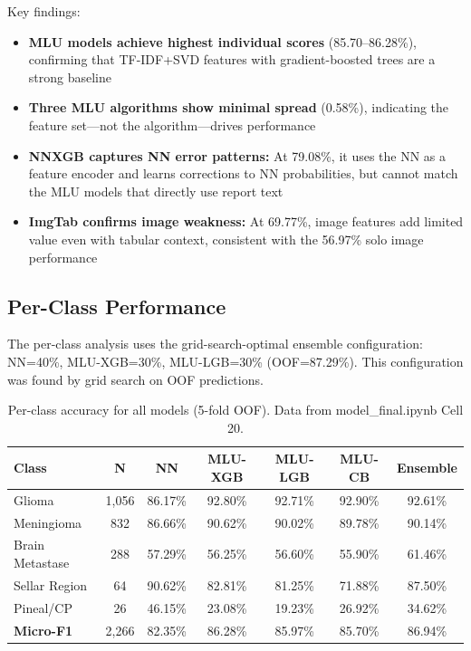 Key findings:
\begin{itemize}
  \item \textbf{MLU models achieve highest individual scores} (85.70--86.28\%), confirming that TF-IDF+SVD features with gradient-boosted trees are a strong baseline
  \item \textbf{Three MLU algorithms show minimal spread} (0.58\%), indicating the feature set---not the algorithm---drives performance
  \item \textbf{NNXGB captures NN error patterns:} At 79.08\%, it uses the NN as a feature encoder and learns corrections to NN probabilities, but cannot match the MLU models that directly use report text
  \item \textbf{ImgTab confirms image weakness:} At 69.77\%, image features add limited value even with tabular context, consistent with the 56.97\% solo image performance
\end{itemize}

\subsection{Per-Class Performance}

The per-class analysis uses the grid-search-optimal ensemble configuration: NN=40\%, MLU-XGB=30\%, MLU-LGB=30\% (OOF=87.29\%). This configuration was found by grid search on OOF predictions.

\begin{table}[H]
\centering
\caption{Per-class accuracy for all models (5-fold OOF). Data from model\_final.ipynb Cell 20.}
\label{tab:per_class}
\begin{tabular}{lcccccc}
\toprule
\textbf{Class} & \textbf{N} & \textbf{NN} & \textbf{MLU-XGB} & \textbf{MLU-LGB} & \textbf{MLU-CB} & \textbf{Ensemble} \\
\midrule
Glioma & 1,056 & 86.17\% & 92.80\% & 92.71\% & 92.90\% & 92.61\% \\
Meningioma & 832 & 86.66\% & 90.62\% & 90.02\% & 89.78\% & 90.14\% \\
Brain Metastase & 288 & 57.29\% & 56.25\% & 56.60\% & 55.90\% & 61.46\% \\
Sellar Region & 64 & 90.62\% & 82.81\% & 81.25\% & 71.88\% & 87.50\% \\
Pineal/CP & 26 & 46.15\% & 23.08\% & 19.23\% & 26.92\% & 34.62\% \\
\midrule
\textbf{Micro-F1} & 2,266 & 82.35\% & 86.28\% & 85.97\% & 85.70\% & 86.94\% \\
\bottomrule
\end{tabular}
\end{table}

